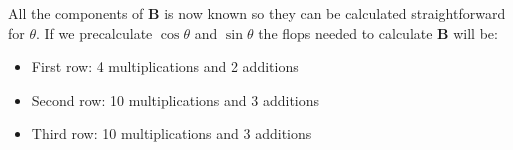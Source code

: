 \documentclass[11pt,a4wide]{article}
\begin{document}
		\noindent All the components of \(\mathbf{B}\) is now known so they can be calculated straightforward for \(\theta\).
		If we precalculate \(\cos{\theta}\) and \(\sin{\theta}\) the flops needed to calculate \(\mathbf{B}\) will be:
		
		\begin{itemize}
		\item First row: 4 multiplications and 2 additions
		\item Second row: 10 multiplications and 3 additions
		\item Third row: 10 multiplications and 3 additions
		\end{itemize}
\end{document}
